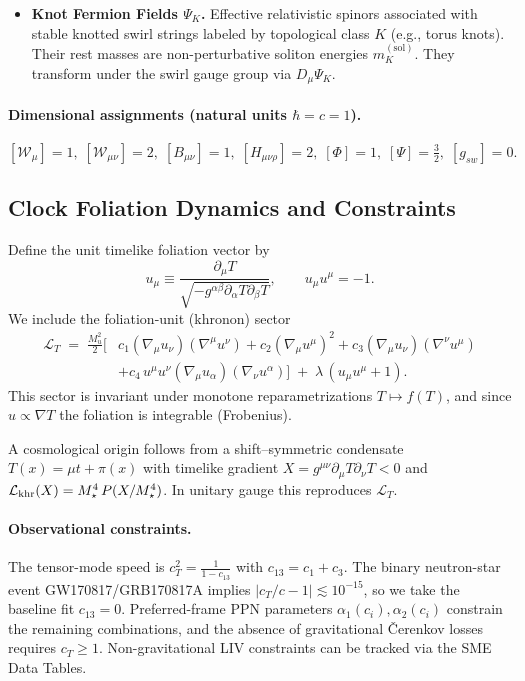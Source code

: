 \begin{itemize}
    \item \textbf{Knot Fermion Fields \(\Psi_K\).}
    Effective relativistic spinors associated with stable knotted swirl strings labeled by topological class \(K\) (e.g., torus knots). Their rest masses are non-perturbative soliton energies \(m_K^{(\mathrm{sol})}\). They transform under the swirl gauge group via \(D_\mu\Psi_K\).

\end{itemize}

\paragraph{Dimensional assignments (natural units \(\hbar=c=1\)).}
\([ \mathcal{W}_\mu ]=1,\; [ \mathcal{W}_{\mu\nu} ]=2,\; [ B_{\mu\nu} ]=1,\; [ H_{\mu\nu\rho} ]=2,\; [ \Phi ]=1,\; [ \Psi ]=\tfrac{3}{2},\; [g_{\!sw}]=0.\)

\subsection{Clock Foliation Dynamics and Constraints}
Define the unit timelike foliation vector by
\begin{equation}
u_\mu \equiv \frac{\partial_\mu T}{\sqrt{-g^{\alpha\beta}\partial_\alpha T\partial_\beta T}},\qquad u_\mu u^\mu=-1.
\end{equation}
We include the foliation-unit (khronon) sector
\begin{align}
\mathcal L_{T} \;=\; \frac{M_u^{2}}{2}\Big[&c_1(\nabla_\mu u_\nu)(\nabla^\mu u^\nu)+c_2(\nabla_\mu u^\mu)^2+c_3(\nabla_\mu u_\nu)(\nabla^\nu u^\mu)\\
&+c_4\,u^\mu u^\nu (\nabla_\mu u_\alpha)(\nabla_\nu u^\alpha)\Big]
\;+\;\lambda\,(u_\mu u^\mu+1).\nonumber
\end{align}
This sector is invariant under monotone reparametrizations \(T\mapsto f(T)\), and since \(u\propto\nabla T\) the foliation is integrable (Frobenius).

A cosmological origin follows from a shift--symmetric condensate \(T(x)=\mu t+\pi(x)\) with timelike gradient \(X=g^{\mu\nu}\partial_\mu T\partial_\nu T<0\) and
\(\mathcal L_{\rm khr}(X)=M_\star^4\,P(X/M_\star^4)\). In unitary gauge this reproduces \(\mathcal L_T\).

\paragraph{Observational constraints.}
The tensor-mode speed is
\(c_T^2=\frac{1}{1-c_{13}}\) with \(c_{13}=c_1+c_3\). The binary neutron-star event GW170817/GRB170817A implies \(|c_T/c-1|\lesssim10^{-15}\), so we take the baseline fit \(c_{13}=0\).
Preferred-frame PPN parameters \(\alpha_1(c_i),\alpha_2(c_i)\) constrain the remaining combinations, and the absence of gravitational \v{C}erenkov losses requires \(c_T\ge 1\).
Non-gravitational LIV constraints can be tracked via the SME Data Tables.

